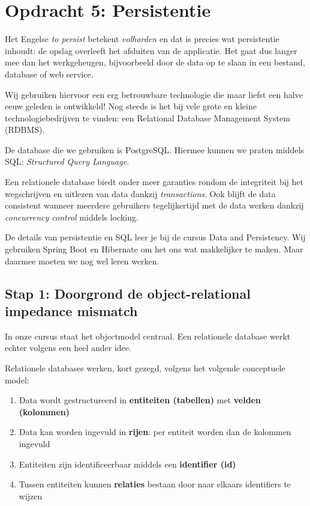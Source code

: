 \chapter{Opdracht 5: Persistentie}
Het Engelse \textit{to persist} betekent \textit{volharden} 
en dat is precies wat persistentie inhoudt:
de opslag overleeft het afsluiten van de applicatie.
Het gaat dus langer mee dan het werkgeheugen, bijvoorbeeld 
door de data op te slaan in een bestand, database of web service.

Wij gebruiken hiervoor een erg betrouwbare technologie die
maar liefst een halve eeuw geleden is ontwikkeld! Nog steeds 
is het bij vele grote en kleine technologiebedrijven te vinden: 
een Relational Database Management System (RDBMS).

De database die we gebruiken is PostgreSQL. 
Hiermee kunnen we praten middels SQL:
\textit{Structured Query Language}.

Een relationele database biedt onder meer garanties rondom de 
integriteit bij het wegschrijven en uitlezen van data 
dankzij \textit{transactions}. Ook blijft de data consistent 
wanneer meerdere gebruikers tegelijkertijd met de data werken
dankzij \textit{concurrency control} middels locking.

De details van persistentie en SQL leer je bij de cursus 
Data and Persistency. Wij gebruiken Spring Boot en Hibernate
om het ons wat makkelijker te maken. Maar daarmee moeten we nog 
wel leren werken.

\newpage

\section{Stap 1: Doorgrond de object-relational impedance mismatch}
In onze cursus staat het objectmodel centraal. Een relationele database 
werkt echter volgens een heel ander idee.

Relationele databases werken, kort gezegd, volgens het volgende conceptuele model:
\begin{enumerate}
    \item Data wordt gestructureerd in \textbf{entiteiten (tabellen)} met \textbf{velden (kolommen)}
    \item Data kan worden ingevuld in \textbf{rijen}: per entiteit worden dan de kolommen ingevuld
    \item Entiteiten zijn identificeerbaar middels een \textbf{identifier (id)}
    \item Tussen entiteiten kunnen \textbf{relaties} bestaan door naar elkaars identifiers te wijzen
\end{enumerate}

